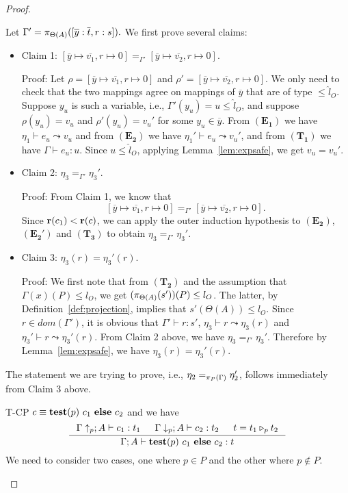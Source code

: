 {{{\begin{proof}
\begin{ProofEnumDesc}
Let $\Gamma' = \app{[\overline{y} : \overline{t}, r : s]}{\Theta(A)}.$
We first prove several claims:
\begin{itemize}
\item Claim 1:
$[\overline{y} \mapsto \overline{v_1}, r \mapsto 0]
=_{\Gamma'} [\overline{y} \mapsto \overline{v_2}, r\mapsto 0].$

Proof:
Let $\rho = [\overline{y} \mapsto \overline{v_1}, r \mapsto 0]$
and $\rho' = [\overline{y} \mapsto \overline{v_2}, r \mapsto 0]$.
We only need to check that the two mappings
agree on mappings of $\overline{y}$ that are of type $\leq \hat{l}_O.$
Suppose $y_u$ is such a variable, i.e., $\Gamma'(y_u) = u \leq \hat{l}_O$,
and suppose $\rho(y_u) = v_u$ and
$\rho'(y_u) = v_u'$ for some $y_u \in \overline{y}.$
From $(\mathbf{E_1})$ we have
$\eta_1 \vdash e_u \leadsto v_u$
and from $(\mathbf{E_2})$
we have $\eta_1' \vdash e_u \leadsto v_u'$,
and from $(\mathbf{T_1})$ we have $\Gamma \vdash e_u : u.$
Since $u \leq \hat{l}_O$, applying Lemma~\ref{lem:expsafe},
we get $v_u = v_u'$.


\item Claim 2: $\eta_3 =_{\Gamma'} \eta_3'.$

Proof: From Claim 1, we know that
$$[\overline{y} \mapsto \overline{v_1}, r \mapsto 0]
=_{\Gamma'} [\overline{y} \mapsto \overline{v_2}, r \mapsto 0].$$
Since $\rank{c_1}<\rank{c}$, we can apply the outer induction
hypothesis to $(\mathbf{E_2})$, $(\mathbf{E_2'})$
and $(\mathbf{T_3})$ to obtain
$\eta_3 =_{\Gamma'} \eta_3'.$

\item Claim 3: $\eta_3(r) = \eta_3'(r).$

Proof: We first note that from $(\mathbf{T_2})$
and the assumption that $\Gamma(x)(P) \leq l_O$, we get
$(\app{s'}{\Theta(A)})(P) \leq l_O$.
The latter, by Definition~\ref{def:projection}, implies  that $s'(\Theta(A)) \leq l_O.$
Since $r \in dom(\Gamma')$, it is obvious that
$\Gamma' \vdash r : s'$,
$\eta_3 \vdash r \leadsto \eta_3(r)$
and $\eta_3' \vdash r \leadsto \eta_3'(r).$
From Claim 2 above, we have $\eta_3 =_{\Gamma'} \eta_3'$.
Therefore by Lemma~\ref{lem:expsafe}, we have
$\eta_3(r) = \eta_3'(r).$
\end{itemize}
The statement we are trying to prove, i.e., $\eta_2 =_{\app{\Gamma}{P}} \eta_2'$,
follows immediately from Claim 3 above.
\item[T-CP] $c\equiv\lcCP{p}{c_1}{c_2}$ and we have
$$
\inference
{\Gamma\uparrow_{p} ; A \vdash c_1 : t_1 &
\Gamma\downarrow_{p} ; A\vdash c_2 : t_2 &
t=\omerge {p} {t_1} {t_2}}
{\Gamma; A\vdash \lcCP{p}{c_1}{c_2} : t}
$$
We need to consider two cases, one where $p \in P$
and the other where $p \not \in P$.


\end{ProofEnumDesc}
\end{proof}}}}
